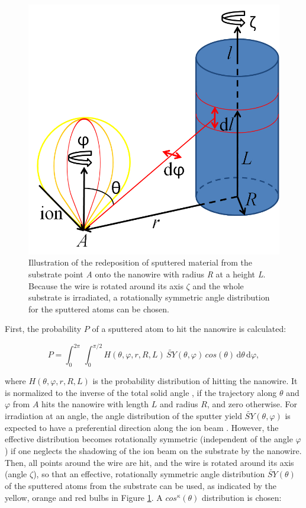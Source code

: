 \begin{figure}
	\centering
		\includegraphics[width=.45\textwidth]{images/redeposit.jpg}
	\caption{Illustration of the redeposition of sputtered material from the substrate point \emph{A} onto the nanowire with radius \emph{R} at a height \emph{L}. Because the wire is rotated around its axis $\zeta$ and the whole substrate is irradiated, a rotationally symmetric angle distribution for the sputtered atoms can be chosen.} 
	\label{redeposit}
\end{figure}

First, the probability $P$ of a sputtered atom to hit the nanowire is calculated:

\begin{equation}
\label{prob1}
P = \int_0^{2\pi} \! \,\int_0^{\pi/2} \!\! H(\theta,\varphi,r,R,L) \, \tilde{SY}(\theta,\varphi) \,cos(\theta)\,\mathrm{d}\theta \, \mathrm{d}\varphi,
\end{equation}

where $H(\theta,\varphi,r,R,L)$ is the probability distribution of hitting the nanowire. It is normalized to the inverse of the total solid angle , if the trajectory along $\theta$ and $\varphi$ from $A$ hits the nanowire with length $L$ and radius $R$, and zero otherwise. For irradiation at an angle, the angle distribution of the sputter yield $\tilde{SY}(\theta,\varphi)$ is expected to have a preferential direction along the ion beam \cite{verdeil_angular_2008}. However, the effective distribution becomes rotationally symmetric (independent of the angle $\varphi$) if one neglects the shadowing of the ion beam on the substrate by the nanowire. Then, all points around the wire are hit, and the wire is rotated around its axis (angle $\zeta$), so that an effective, rotationally symmetric angle distribution $\tilde{SY}(\theta)$ of the sputtered atoms from the substrate can be used, as indicated by the yellow, orange and red bulbs in Figure \ref{redeposit}. A $cos^\kappa(\theta)$ distribution is chosen: 

